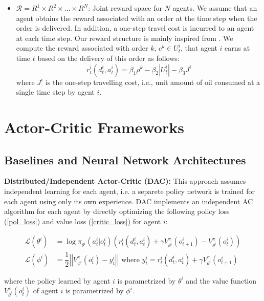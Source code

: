 \documentclass{article}
\theoremstyle{defn}
\theoremstyle{prop}
\theoremstyle{assm}
\theoremstyle{theoremm}
\theoremstyle{remarkk}
\theoremstyle{lem}
\theoremstyle{example}
\theoremstyle{example}
\begin{document}
\begin{itemize}[leftmargin=*]
    \item $\mathcal{R} = R^1 \times R^2 \times \ldots \times R^N$: Joint reward space for $N$ agents. We assume that an agent obtains the reward associated with an order at the time step when the order is delivered. In addition, a one-step travel cost is incurred to an agent at each time step. Our reward structure is mainly inspired from \cite{al2019deeppool}. We compute the reward associated with order $k$, $c^k \in U^i_t$, that agent $i$ earns at time $t$ based on the delivery of this order as follows:
    \begin{equation}
         r^i_t(d_t^i, a^i_t) = \beta_1 \rho^k -\beta_2 |U^i_t| - \beta_3 J^i
    \end{equation} 
    where $J^i$ is the one-step travelling cost, i.e., unit amount of oil consumed at a single time step by agent $i$.
\end{itemize}

\section{Actor-Critic Frameworks}\label{ac}
\subsection{Baselines and Neural Network Architectures}\label{base}

\textbf{Distributed/Independent Actor-Critic (DAC):} This approach assumes independent learning for each agent, i.e. a separete policy network is trained for each agent using only its own experience. DAC implements an independent AC algorithm for each agent by directly optimizing the following policy loss (\ref{pol_loss}) and value loss (\ref{critic_loss}) for agent $i$:

\begin{align}
    \mathcal{L}(\theta^i) &= \log {\pi_{\theta^i}} (a_t^i | o_t^i)(r^i_t(d_t^i, a_t^i) + \gamma V^{\pi}_{\theta^i}(o_{t+1}^i) - V^{\pi}_{\theta^i}(o_{t}^i)) \label{pol_loss} \\
    \mathcal{L}(\phi^i) &= \dfrac{1}{2} \left| \left|V^\pi_{\phi^i} (o_t^i) - y^i_t \right|\right| \text{ where } y^i_t = r^i_t(d_t^i, a_t^i) + \gamma V^{\pi}_{\theta^i}(o_{t+1}^i) \label{critic_loss}
\end{align}

where the policy learned by agent $i$ is parametrized by $\theta^i$ and the value function $V^{\pi}_{\theta^i}(o_{t}^i)$ of agent $i$ is parametrized by $\phi^i$. 
\end{document}
